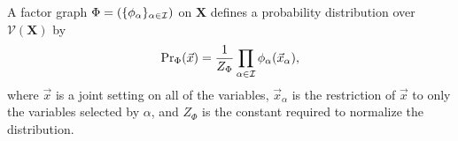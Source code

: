 \documentclass{article}
\theoremstyle{plain}
\theoremstyle{definition}
\theoremstyle{remark}
\newcommand{\V}{\mathcal V}
\numberwithin{equation}{section}
\begin{document}
	A factor graph $\Phi = (\{\phi_\alpha\}_{\alpha \in \cal I})$ on $\mathbf X$ defines a probability distribution over $\V(\mathbf X)$ by 
	\begin{align*}
				\Pr\nolimits_\Phi(\vec x) 
		= \frac{1}{Z_\Phi} \prod_{\alpha \in \cal I}
								\phi_\alpha(\vec x_{\alpha}), 
	\end{align*}
	where $\vec{x}$ is a joint setting on all of the variables, $\vec{x}_\alpha$ is the restriction of $\vec{x}$ to only the variables selected by $\alpha$, and $Z_\Phi$ is the constant required to normalize the distribution. 
		
\end{document}

